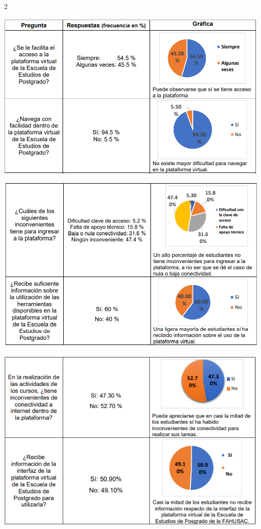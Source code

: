 \documentclass[12pt,spanish,Letterpaper,openany]{book}
\begin{document}
\begin {multicols}{2}
\begin{center}\includegraphics[width=1\linewidth]{images/09_03} \end{center}

\begin{center}\includegraphics[width=1\linewidth]{images/09_02} \end{center}

\begin{center}\includegraphics[width=1\linewidth]{images/09_04} \end{center}


\end{multicols}
\end{document}
